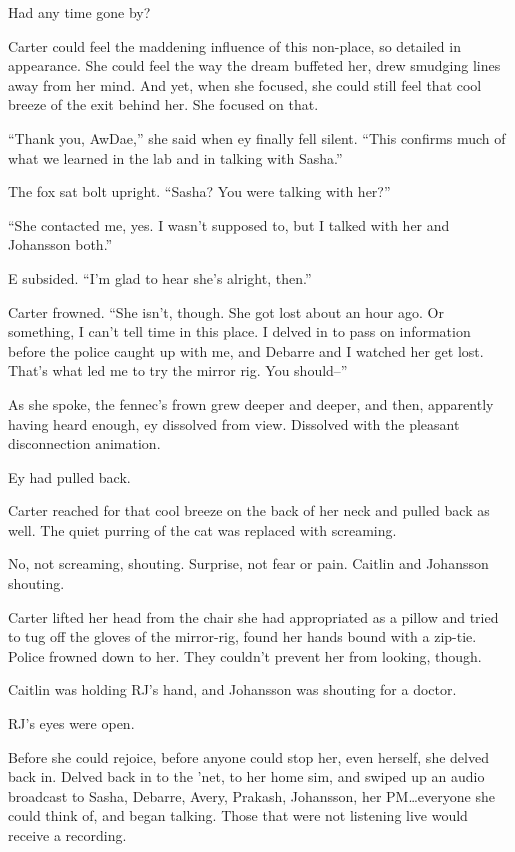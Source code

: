 Had any time gone by?

Carter could feel the maddening influence of this non-place, so detailed in appearance. She could feel the way the dream buffeted her, drew smudging lines away from her mind. And yet, when she focused, she could still feel that cool breeze of the exit behind her. She focused on that.

``Thank you, AwDae,'' she said when ey finally fell silent. ``This confirms much of what we learned in the lab and in talking with Sasha.''

The fox sat bolt upright. ``Sasha? You were talking with her?''

``She contacted me, yes. I wasn't supposed to, but I talked with her and Johansson both.''

E subsided. ``I'm glad to hear she's alright, then.''

Carter frowned. ``She isn't, though. She got lost about an hour ago. Or something, I can't tell time in this place. I delved in to pass on information before the police caught up with me, and Debarre and I watched her get lost. That's what led me to try the mirror rig. You should--''

As she spoke, the fennec's frown grew deeper and deeper, and then, apparently having heard enough, ey dissolved from view. Dissolved with the pleasant disconnection animation.

Ey had pulled back.

Carter reached for that cool breeze on the back of her neck and pulled back as well. The quiet purring of the cat was replaced with screaming.

No, not screaming, shouting. Surprise, not fear or pain. Caitlin and Johansson shouting.

Carter lifted her head from the chair she had appropriated as a pillow and tried to tug off the gloves of the mirror-rig, found her hands bound with a zip-tie. Police frowned down to her. They couldn't prevent her from looking, though.

Caitlin was holding RJ's hand, and Johansson was shouting for a doctor.

RJ's eyes were open.

Before she could rejoice, before anyone could stop her, even herself, she delved back in. Delved back in to the 'net, to her home sim, and swiped up an audio broadcast to Sasha, Debarre, Avery, Prakash, Johansson, her PM\ldots{}everyone she could think of, and began talking. Those that were not listening live would receive a recording.

